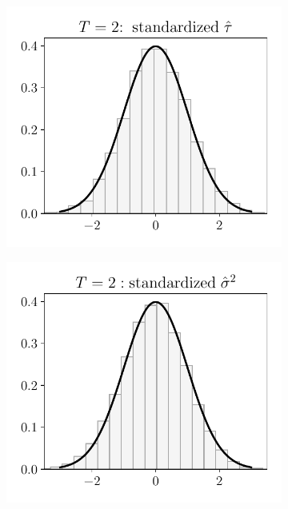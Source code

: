 \begin{figure}[h!]
	\centering
	\begin{subfigure}{0.3\textwidth}
		\centering
		\includegraphics[width=1\linewidth]{plots/simulation/tau_T_2.pdf}
	\end{subfigure}
	\begin{subfigure}{0.3\textwidth}
		\centering
		\includegraphics[width=1\linewidth]{plots/simulation/sigma_T_2.pdf}

\end{subfigure}
\end{figure}
